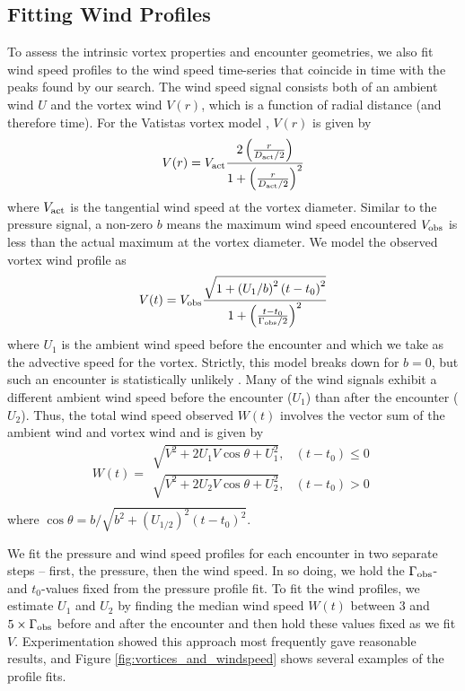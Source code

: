 \documentclass{aastex63}
\begin{document}
\subsection{Fitting Wind Profiles}
\label{sec:Fitting Wind Profiles}
To assess the intrinsic vortex properties and encounter geometries, we also fit wind speed profiles to the wind speed time-series that coincide in time with the peaks found by our search. The wind speed signal consists both of an ambient wind $U$ and the vortex wind $V(r)$, which is a function of radial distance (and therefore time). For the Vatistas vortex model \citep{1991ExFl...11...73V}, $V(r)$ is given by
\begin{equation}
    V(r) = V_{\rm act} \frac{2 \left( \frac{r}{D_{\rm act}/2} \right) }{1 + \left( \frac{r}{D_{\rm act}/2} \right)^2}
\end{equation}
where $V_{\rm act}$ is the tangential wind speed at the vortex diameter. Similar to the pressure signal, a non-zero $b$ means the maximum wind speed encountered $V_{\rm obs}$ is less than the actual maximum at the vortex diameter. We model the observed vortex wind profile as
\begin{equation}
    V(t) = V_{\rm obs} \frac{\sqrt{1 + \left( U_1/b \right)^2 \left( t - t_0 \right)^2}}{1 + \left(\frac{t - t_0}{\Gamma_{\rm obs}/2}\right)^2}\label{eqn:wind_profile}
\end{equation}
where $U_1$ is the ambient wind speed before the encounter and which we take as the advective speed for the vortex. Strictly, this model breaks down for $b = 0$, but such an encounter is statistically unlikely \citep{2018Icar..299..166J}. Many of the wind signals exhibit a different ambient wind speed before the encounter ($U_1$) than after the encounter ($U_2$). Thus, the total wind speed observed $W(t)$ involves the vector sum of the ambient wind and vortex wind and is given by 
\begin{equation}
    W(t) = 
    \begin{array}{ll}
            \sqrt{V^2 + 2 U_1 V \cos \theta + U_1^2}, & \left( t - t_0 \right) \leq 0\\
            \sqrt{V^2 + 2 U_2 V \cos \theta + U_2^2}, & \left( t - t_0 \right) > 0\\
    \end{array} \label{eqn:total_wind_speed}
\end{equation}
where $\cos \theta = b/\sqrt{b^2 + \left( U_{1/2} \right)^2\left( t - t_0 \right)^2}$. 

We fit the pressure and wind speed profiles for each encounter in two separate steps -- first, the pressure, then the wind speed. In so doing, we hold the $\Gamma_{\rm obs}$- and $t_0$-values fixed from the pressure profile fit. To fit the wind profiles, we estimate $U_1$ and $U_2$ by finding the median wind speed $W(t)$ between $3$ and $5\times\Gamma_{\rm obs}$ before and after the encounter and then hold these values fixed as we fit $V$. Experimentation showed this approach most frequently gave reasonable results, and Figure \ref{fig:vortices_and_windspeed} shows several examples of the profile fits. 
\end{document}
